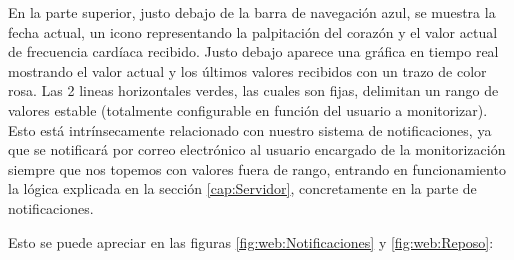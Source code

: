 En la parte superior, justo debajo de la barra de navegación azul, se muestra la fecha actual, un icono representando la palpitación del corazón y el valor actual de frecuencia cardíaca recibido. Justo debajo aparece una gráfica en tiempo real mostrando el valor actual y los últimos valores recibidos con un trazo de color rosa. Las 2 lineas horizontales verdes, las cuales son fijas, delimitan un rango de valores estable (totalmente configurable en función del usuario a monitorizar). Esto está intrínsecamente relacionado con nuestro sistema de notificaciones, ya que se notificará por correo electrónico al usuario encargado de la monitorización siempre que nos topemos con valores fuera de rango, entrando en funcionamiento la lógica explicada en la sección \ref{cap:Servidor}, concretamente en la parte de notificaciones.

Esto se puede apreciar en las figuras \ref{fig:web:Notificaciones} y \ref{fig:web:Reposo}:


